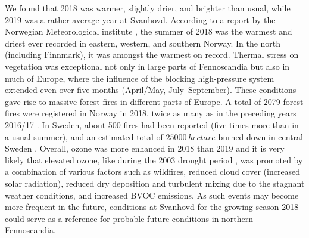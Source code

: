 \documentclass[bg, manuscript]{copernicus}
\begin{document}
We found that 2018 was warmer, slightly drier, and brighter than usual, while 2019 was a rather average year at Svanhovd. According to a report by the Norwegian Meteorological institute \citep{MetNOR2019}, the summer of 2018 was the warmest and driest ever recorded in eastern, western, and southern Norway. In the north (including Finnmark), it was amongst the warmest on record. Thermal stress on vegetation was exceptional not only in large parts of Fennoscandia but also in much of Europe, where the influence of the blocking high-pressure system extended even over five months (April/May, July--September). These conditions gave rise to massive forest fires in different parts of Europe. A total of 2079 forest fires were registered in Norway in 2018, twice as many as in the preceding years 2016/17 \citep[last accessed April 2020]{DSB2019}. In Sweden, about 500 fires had been reported (five times more than in a usual summer), and an estimated total of $25000\,\unit{hectare}$ burned down in central Sweden \citep{SOU2019}. Overall, ozone was more enhanced in 2018 than 2019 and it is very likely that elevated ozone, like during the 2003 drought period \citep{JGR:Solberg2018}, was promoted by a combination of various factors such as wildfires, reduced cloud cover (increased solar radiation), reduced dry deposition and turbulent mixing due to the stagnant weather conditions, and increased BVOC emissions. As such events may become more frequent in the future, conditions at Svanhovd for the growing season 2018 could serve as a reference for probable future conditions in northern Fennoscandia.
\end{document}
